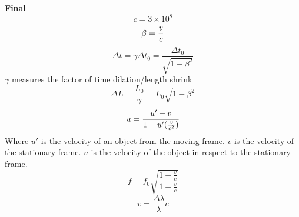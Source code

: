 \documentclass[11pt]{article}
\begin{document}
    \noindent \textbf{Final }%
    \\ \noindent \newline
    \begin{equation}
        c = 3 \times 10^8 \tag{light}
    \end{equation}
    \begin{equation}
        \beta = \frac{v}{c} \notag
    \end{equation}
    \begin{equation}
        \Delta t =\gamma \Delta t_0 = \frac{\Delta t_0}{\sqrt{1- \beta^2}} \tag{time dilation}
    \end{equation}
    $\gamma$ measures the factor of time dilation/length shrink
    \begin{equation}
        \Delta L = \frac{L_0}{\gamma}=L_0 \sqrt{1 - \beta^2} \tag{length contraction}
    \end{equation}
    \begin{equation}
        u = \frac{u' + v}{1 + u'(\frac{v}{c^2})} \notag
    \end{equation}
Where $u'$ is the velocity of an object from the moving frame.
    $v$ is the velocity of the stationary frame.
    $u$ is the velocity of the object in respect to the stationary frame.
\begin{equation}
    f = f_0 \sqrt {\frac{1 \pm \frac{v}{c}}{1 \mp \frac{v}{c}}} \tag{Doppler Effect}
\end{equation}
    \begin{equation}
        v = \frac{\Delta \lambda}{\lambda} c \tag{color shift}
    \end{equation}
\end{document}
